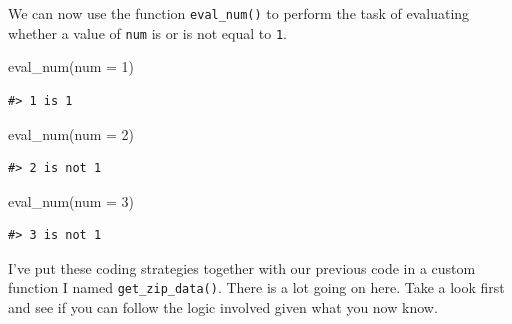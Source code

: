 \documentclass[
  letterpaper,
]{scrbook}
\newenvironment{Shaded}{\begin{snugshade}}{\end{snugshade}}
\newcommand{\AttributeTok}[1]{\textcolor[rgb]{0.00,0.00,0.00}{#1}}
\newcommand{\DecValTok}[1]{\textcolor[rgb]{0.00,0.00,0.00}{#1}}
\newcommand{\FunctionTok}[1]{\textcolor[rgb]{0.00,0.00,0.00}{#1}}
\newcommand{\NormalTok}[1]{\textcolor[rgb]{0.00,0.00,0.00}{#1}}
\begin{document}
We can now use the function \texttt{eval\_num()} to perform the task of
evaluating whether a value of \texttt{num} is or is not equal to
\texttt{1}.

\begin{Shaded}
\begin{Highlighting}[]
\FunctionTok{eval\_num}\NormalTok{(}\AttributeTok{num =} \DecValTok{1}\NormalTok{)}
\end{Highlighting}
\end{Shaded}

\begin{verbatim}
#> 1 is 1
\end{verbatim}

\begin{Shaded}
\begin{Highlighting}[]
\FunctionTok{eval\_num}\NormalTok{(}\AttributeTok{num =} \DecValTok{2}\NormalTok{)}
\end{Highlighting}
\end{Shaded}

\begin{verbatim}
#> 2 is not 1
\end{verbatim}

\begin{Shaded}
\begin{Highlighting}[]
\FunctionTok{eval\_num}\NormalTok{(}\AttributeTok{num =} \DecValTok{3}\NormalTok{)}
\end{Highlighting}
\end{Shaded}

\begin{verbatim}
#> 3 is not 1
\end{verbatim}

I've put these coding strategies together with our previous code in a
custom function I named \texttt{get\_zip\_data()}. There is a lot going
on here. Take a look first and see if you can follow the logic involved
given what you now know.
\end{document}

